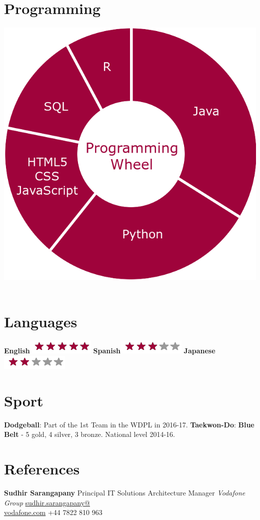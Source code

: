 \documentclass[]{friggeri-cv}
\begin{document}
\begin{aside}
    \section{Programming}
        \includegraphics[scale=0.15]{img/programmingwheel.png}
    ~
    \section{Languages}
        \textbf{English}\includegraphics[scale=0.40]{img/5stars.png}
        \textbf{Spanish}\includegraphics[scale=0.40]{img/3stars.png}
        \textbf{Japanese}\includegraphics[scale=0.40]{img/2stars.png}
    ~
    \section{Sport}
        \textbf{Dodgeball}:
        Part of the 1st Team in the WDPL in 2016-17.
        \textbf{Taekwon-Do}:
        \textbf{Blue Belt} - 5 gold, 4 silver, 3 bronze.
        National level 2014-16.
    ~
    \section{References}
        \textbf{Sudhir Sarangapany}
        Principal IT Solutions Architecture Manager
        \emph{Vodafone Group}
        \href{mailto:sudhir.sarangapany@vodafone.com}{sudhir.sarangapany@\\vodafone.com}
        +44 7822 810 963
\end{aside}
\end{document}
